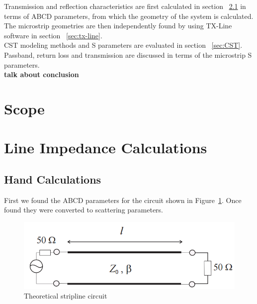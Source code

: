 \documentclass{paper}
\begin{document}
Transmission and reflection characteristics are first calculated in section ~\ref{sec:handcalcs} in terms of ABCD parameters, from which the geometry of the system is calculated. The microstrip geometries are then independently found by using TX-Line software in section ~\ref{sec:tx-line}.\\

CST modeling methods and S parameters are evaluated in section ~\ref{sec:CST}. Passband, return loss and transmission are discussed in terms of the microstrip S parameters.\\

\textbf{talk about conclusion}

\newpage
\tableofcontents

\newpage
\section{Scope}


\newpage
\section{Line Impedance Calculations}
\subsection{Hand Calculations}
\label{sec:handcalcs}
First we found the ABCD parameters for the circuit shown in Figure~\ref{fig:theoretical_circuit}. Once found they were converted to scattering parameters.

\begin{figure}[H]
	\centering
	\includegraphics[scale=0.5]{IMG/theoretical_circuit}
	\caption{Theoretical stripline circuit}
	\label{fig:theoretical_circuit}
\end{figure}
\end{document}
